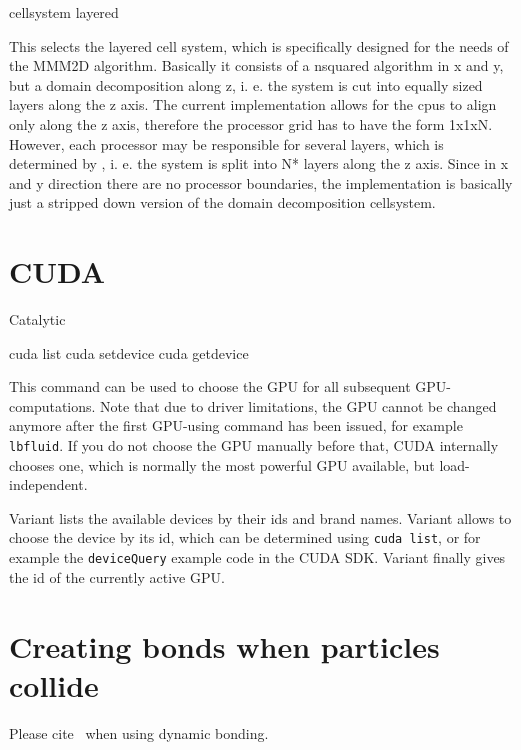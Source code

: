 \begin{essyntax}
  cellsystem layered 
\end{essyntax}

This selects the layered cell system, which is specifically designed
for the needs of the MMM2D algorithm. Basically it consists of a
nsquared algorithm in x and y, but a domain decomposition along z, i.
e. the system is cut into equally sized layers along the z axis. The
current implementation allows for the cpus to align only along the z
axis, therefore the processor grid has to have the form 1x1xN.
However, each processor may be responsible for several layers, which
is determined by , i. e. the system is split into
N* layers along the z axis. Since in x and y direction
there are no processor boundaries, the implementation is basically
just a stripped down version of the domain decomposition cellsystem.

\section{CUDA}Catalytic
\label{sec:cuda}
\begin{essyntax}
   cuda list
   cuda setdevice 
   cuda getdevice
\end{essyntax}

This command can be used to choose the GPU for all subsequent
GPU-computations. Note that due to driver limitations, the GPU cannot
be changed anymore after the first GPU-using command has been issued,
for example \texttt{lbfluid}. If you do not choose the GPU manually
before that, CUDA internally chooses one, which is normally the most
powerful GPU available, but load-independent.

Variant  lists the available devices by their ids and brand
names. Variant  allows to choose the device by its id,
which can be determined using \texttt{cuda list}, or for example the
\texttt{deviceQuery} example code in the CUDA SDK. Variant 
finally gives the id of the currently active GPU.


\section{Creating bonds when particles collide}

\begin{citebox}
  Please cite~ when using dynamic bonding.
\end{citebox}


